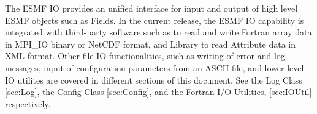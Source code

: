 

The ESMF IO provides an unified interface for input and output of
high level ESMF objects such as Fields.  In the current release, the ESMF IO 
capability is integrated with third-party software such as 
to read and write Fortran array data in MPI\_IO binary or NetCDF format, and 
Library to read Attribute data in XML format.  Other file IO
functionalities, such as writing of error and log messages, input of
configuration parameters from an ASCII file, and lower-level IO utilites are 
covered in different sections of this document.  See the Log Class 
\ref{sec:Log}, the Config Class \ref{sec:Config}, and the Fortran 
I/O Utilities, \ref{sec:IOUtil} respectively.


%
%


